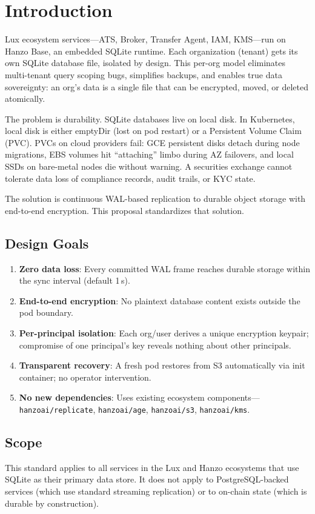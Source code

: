 \section{Introduction}
\label{sec:intro}

Lux ecosystem services---ATS, Broker, Transfer Agent, IAM, KMS---run
on Hanzo Base, an embedded SQLite runtime. Each organization (tenant)
gets its own SQLite database file, isolated by design. This per-org
model eliminates multi-tenant query scoping bugs, simplifies backups,
and enables true data sovereignty: an org's data is a single file that
can be encrypted, moved, or deleted atomically.

The problem is durability. SQLite databases live on local disk. In
Kubernetes, local disk is either emptyDir (lost on pod restart) or a
Persistent Volume Claim (PVC). PVCs on cloud providers fail: GCE
persistent disks detach during node migrations, EBS volumes hit
``attaching'' limbo during AZ failovers, and local SSDs on bare-metal
nodes die without warning. A securities exchange cannot tolerate data
loss of compliance records, audit trails, or KYC state.

The solution is continuous WAL-based replication to durable object
storage with end-to-end encryption. This proposal standardizes that
solution.

\subsection{Design Goals}

\begin{enumerate}[nosep]
  \item \textbf{Zero data loss}: Every committed WAL frame reaches
    durable storage within the sync interval (default 1\,s).
  \item \textbf{End-to-end encryption}: No plaintext database content
    exists outside the pod boundary.
  \item \textbf{Per-principal isolation}: Each org/user derives a unique
    encryption keypair; compromise of one principal's key reveals
    nothing about other principals.
  \item \textbf{Transparent recovery}: A fresh pod restores from S3
    automatically via init container; no operator intervention.
  \item \textbf{No new dependencies}: Uses existing ecosystem
    components---\texttt{hanzoai/replicate}, \texttt{hanzoai/age},
    \texttt{hanzoai/s3}, \texttt{hanzoai/kms}.
\end{enumerate}

\subsection{Scope}

This standard applies to all services in the Lux and Hanzo ecosystems
that use SQLite as their primary data store. It does not apply to
PostgreSQL-backed services (which use standard streaming replication)
or to on-chain state (which is durable by construction).

